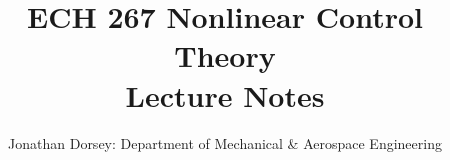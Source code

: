 \documentclass[12px]{article}
\begin{document}
    \title{ECH 267 Nonlinear Control Theory \\ Lecture Notes }

    \author{Jonathan Dorsey: Department of Mechanical \& Aerospace Engineering}

    \maketitle


    
    
\end{document}
